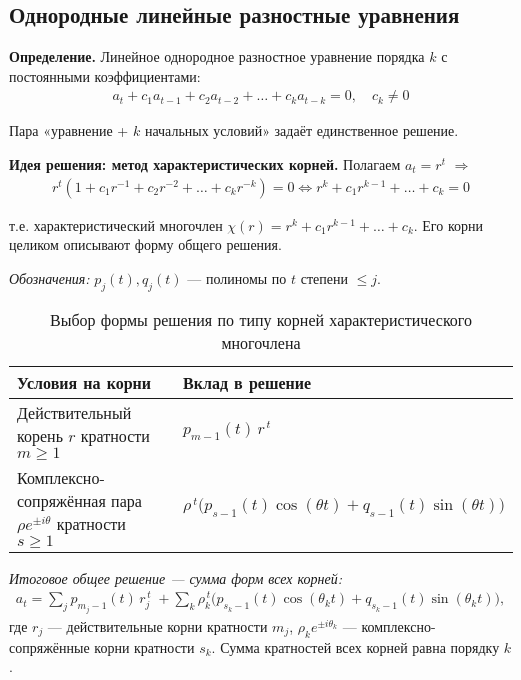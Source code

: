 \subsection{Однородные линейные разностные уравнения}\label{subsec:homogeneous}

\begin{center}
\end{center}

\textbf{Определение.} Линейное однородное разностное уравнение порядка $k$ с постоянными коэффициентами:
\begin{align}
a_t + c_1 a_{t-1} + c_2 a_{t-2} + \dots + c_k a_{t-k} = 0, \quad c_k \neq 0
\end{align}

Пара «уравнение + $k$ начальных условий» задаёт единственное решение.

\textbf{Идея решения: метод характеристических корней.} Полагаем $a_t = r^t$ $\Rightarrow$
\begin{align}
r^t (1 + c_1 r^{-1} + c_2 r^{-2} + \dots + c_k r^{-k}) = 0 \iff r^k + c_1 r^{k-1} + \dots + c_k = 0
\end{align}

т.е. характеристический многочлен $\chi(r) = r^k + c_1 r^{k-1} + \dots + c_k$. Его корни целиком описывают форму общего решения.

\textit{Обозначения:} $p_j(t), q_j(t)$ — полиномы по $t$ степени $\le j$.

\begin{table}[h!]
\centering
\caption{Выбор формы решения по типу корней характеристического многочлена}
\label{tab:form-choices}
\begin{tabular}{|l|l|}
\hline
\textbf{Условия на корни} & \textbf{Вклад в решение} \\
\hline
Действительный корень $r$ кратности $m\ge 1$ &
$p_{m-1}(t)\, r^{\,t}$ \\
\hline
Комплексно-сопряжённая пара $\rho e^{\pm i\theta}$ кратности $s\ge 1$ &
$\rho^{\,t}\big(p_{s-1}(t)\cos(\theta t)+q_{s-1}(t)\sin(\theta t)\big)$ \\
\hline
\end{tabular}

\vspace{0.5em}
\emph{Итоговое общее решение — сумма форм всех корней:}
\begin{align*}
a_t = \sum_{j} p_{m_j-1}(t)\, r_j^{\,t}
\; + \sum_{k} \rho_k^{\,t}\big(p_{s_k-1}(t)\cos(\theta_k t)+q_{s_k-1}(t)\sin(\theta_k t)\big),
\end{align*}
где $r_j$ — действительные корни кратности $m_j$, $\rho_k e^{\pm i\theta_k}$ — комплексно-сопряжённые корни кратности $s_k$.
Сумма кратностей всех корней равна порядку $k$.
\end{table}

